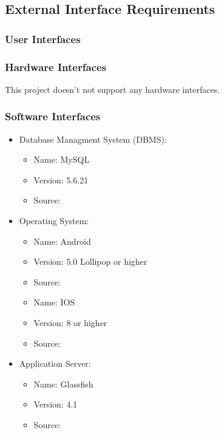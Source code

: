\subsection{External Interface Requirements}
\subsubsection{User Interfaces}


\clearpage
\subsubsection{Hardware Interfaces}
This project doesn't not support any hardware interfaces.

\subsubsection{Software Interfaces}
\renewcommand{\labelitemi}{$\bullet$}
\begin{itemize}
\item Database Managment System (DBMS):
	\begin{itemize}
	\item Name: MySQL
	\item Version: 5.6.21
	\item Source: {\href{https://www.mysql.com}		{\color{Black}{https://www.mysql.com}}}
	\end{itemize}
\item Operating System:
	\begin{itemize}
	\item Name: Android
	\item Version: 5.0 Lollipop or higher
	\item Source: {\href{https://www.android.com/}		{\color{Black}{https://www.android.com/}}}
	\end{itemize}
	\begin{itemize}
	\item Name: IOS
	\item Version: 8 or higher
	\item Source: {\href{https://www.apple.com/ios}		{\color{Black}{https://www.apple.com/ios}}}
	\end{itemize} 
\item Application Server:
	\begin{itemize}
	\item Name: Glassfish
	\item Version: 4.1
	\item Source: {\href{https://javaee.github.io/glassfish/}		{\color{Black}{https://javaee.github.io/glassfish/}}}
	\end{itemize}
	
\end{itemize}


